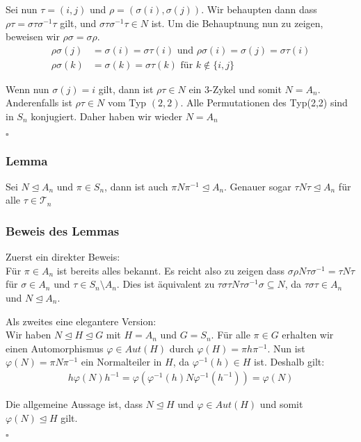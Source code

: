 \documentclass[12pt, german]{article}
\newcommand{\bewiesen}{

\begin{flushright}
		$\square$  \\
\end{flushright}}
\begin{document}
	Sei nun $\tau = (i, j)$ und $\rho = (\sigma(i), \sigma(j))$. 
	Wir behaupten dann dass $\rho\tau = \sigma\tau\sigma^{-1}\tau$ gilt, und $\sigma\tau\sigma^{-1}\tau \in N$ ist. Um die Behauptnung nun zu zeigen, beweisen wir $\rho\sigma = \sigma\rho$. 
	\begin{align*}
		\rho\sigma(j) &= \sigma(i) = \sigma\tau(i) \text{ und } \rho\sigma(i) = \sigma(j) = \sigma\tau(i) \\
		\rho\sigma(k) &= \sigma(k) = \sigma\tau(k) \text{ für } k \not \in \{i, j\}
	\end{align*}
	
	Wenn nun $\sigma(j) = i$ gilt, dann ist $\rho\tau \in N$ ein $3$-Zykel und somit $N=A_n$. 
	Anderenfalls ist $\rho\tau \in N$ vom Typ $(2,2)$. Alle Permutationen des Typ(2,2) sind in $S_n$ konjugiert. Daher haben wir wieder $N=A_n$
	\bewiesen
	
\subsubsection{Lemma}
	Sei $N \trianglelefteq A_n$ und $\pi \in S_n$, dann ist auch $\pi N\pi^{-1} \trianglelefteq A_n$. Genauer sogar $\tau N \tau \trianglelefteq A_n$ für alle $\tau \in \mathcal T_n$
\subsubsection{Beweis des Lemmas}
	Zuerst ein direkter Beweis: \\
	Für $\pi \in A_n$ ist bereits alles bekannt. Es reicht also zu zeigen dass $\sigma\rho N\tau\sigma^{-1} = \tau N \tau$ für $\sigma \in A_n$ und $\tau\in S_n \setminus A_n$. Dies ist äquivalent zu $ \tau \sigma \tau N \tau \sigma^{-1}\sigma \subseteq N$, da $\tau\sigma\tau \in A_n$ und $N\trianglelefteq A_n$. 
	\newline
	
	Als zweites eine elegantere Version: \\
	Wir haben $N \trianglelefteq H \trianglelefteq G$ mit $H = A_n$ und $G= S_n$. Für alle $\pi \in G$ erhalten wir einen Automorphismus $\varphi \in Aut(H)$ durch $\varphi(H) = \pi h\pi^{-1}$. Nun ist $\varphi(N) = \pi N\pi^{-1}$ ein Normalteiler in $H$, da $\varphi^{-1}(h) \in H$ ist. 
	Deshalb gilt: 
	\begin{align*}
		h\varphi(N)h^{-1} = \varphi(\varphi^{-1}(h)N\varphi^{-1}(h^{-1})) = \varphi(N)
	\end{align*}
	
	Die allgemeine Aussage ist, dass $N \trianglelefteq H$ und $\varphi \in Aut(H)$ und somit $\varphi(N) \trianglelefteq H$ gilt. 
	\bewiesen
\end{document}
